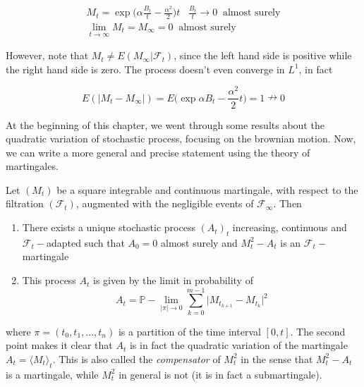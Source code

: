 \begin{gather*}
    M_t = \exp{\Big(\alpha \frac{B_t}{t} -\frac{\alpha^2}{2}\Big)t} \;\;\; \frac{B_t}{t} \to 0 \;\; \text{almost surely} \\
    \lim_{t \to \infty} M_t = M_{\infty} = 0 \;\; \text{almost surely}
\end{gather*}

However, note that $M_t \neq E(M_{\infty} \vert \mathcal{F}_t)$, since the left hand side is positive while the right hand side is zero. The process doesn't even converge in $L^1$, in fact

\begin{equation*}
    E(\vert M_t - M_{\infty} \vert) = E\Big( \exp{\alpha B_t - \frac{\alpha^2}{2}t} \Big) = 1 \nrightarrow 0 
\end{equation*}

At the beginning of this chapter, we went through some results about the quadratic variation of stochastic process, focusing on the brownian motion. Now, we can write a more general and precise statement using the theory of martingales.

\begin{theorem}[Doob]
    Let $(M_t)$ be a square integrable and continuous martingale, with respect to the filtration $(\mathcal{F}_t)$, augmented with the negligible events of $\mathcal{F}_{\infty}$. Then 
    \begin{enumerate}
        \item There exists a unique stochastic process $(A_t)_t$ increasing, continuous and $\mathcal{F}_t-$adapted such that $A_0 = 0$ almost surely and $M_t^2 - A_t$ is an $\mathcal{F}_t-$martingale
        \item This process $A_t$ is given by the limit in probability of 
        \begin{equation}
            A_t = \mathbb{P}-\lim_{\vert \pi \vert \to 0} \sum_{k=0}^{m-1} \vert M_{t_{k+1}} - M_{t_k} \vert^2
        \end{equation}
    \end{enumerate}
\end{theorem}

where $\pi = (t_0,t_1,...,t_n)$ is a partition of the time interval $[0,t]$. The second point makes it clear that $A_t$ is in fact the quadratic variation of the martingale $A_t = \langle M_t \rangle_t$. This is also called the \textit{compensator} of $M_t^2$ in the sense that $M_t^2 - A_t$ is a martingale, while $M_t^2$ in general is not (it is in fact a submartingale). 

